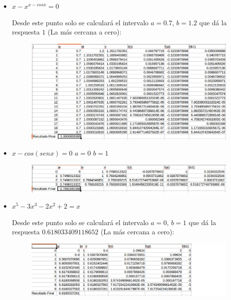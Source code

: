 \documentclass[a4paper,12pt]{article}
\begin{document}
     \begin{itemize}
      \item $x-x^{x-cosx} = 0$
      
      Desde este punto solo se calculará el intervalo $a = 0.7$, $b = 1.2$ que dá la
     respuesta $1$ (La más cercana a cero):
     
     \begin{figure}[h]
      \centering
      \includegraphics[scale = 0.4]{31.eps}
     \end{figure}
     
     \item $x-cos(senx) = 0$ $a = 0$ $b = 1$
     
     \vspace{4.5mm}
      
      \begin{figure}[h]
      \centering
      \includegraphics[scale = 0.4]{32.eps}
     \end{figure}

     \item $x^5 - 3x^3 - 2x^2 + 2 = x$
     
     Desde este punto solo se calculará el intervalo $a = 0$, $b = 1$ que dá la
     respuesta $0.618033409118652$ (La más cercana a cero):
     
      \begin{figure}[h]
      \centering
      \includegraphics[scale = 0.4]{33.eps}
     \end{figure}
    \end{itemize}
 
\end{document}
